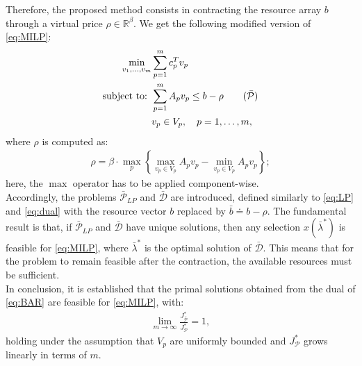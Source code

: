 Therefore, the proposed method consists in contracting the resource array $b$ through a virtual price $\rho \in \mathbb{R}^{\beta}$. We get the following modified version of \ref{eq:MILP}:
\begin{align*}
    \min_{v_1, \dots, v_m} & \sum_{p=1}^{m} c_p^T v_p                                                     \\
    \text{subject to: }    & \sum_{p=1}^{m} A_p v_p \leq b -\rho \tag{$\bar{\mathcal{P}}$} \label{eq:BAR} \\
                           & v_p \in V_p, \quad p = 1, \dots, m,
\end{align*}
where $\rho$ is computed as:
\begin{align}
    \rho = \beta\cdot\max_{p} \left\{\max_{v_p \in V_p}A_p v_p - \min_{v_p \in V_p}A_p v_p \right\}; \label{eq:rho_vuj}
\end{align}
here, the $\max$ operator has to be applied component-wise.\\
Accordingly, the problems $\bar{\mathcal{P}}_{LP}$ and $\bar{\mathcal{D}}$ are introduced, defined similarly to \ref{eq:LP} and \ref{eq:dual} with the resource vector $b$ replaced by $\bar{b}\doteq b - \rho$. The fundamental result is that, if $\bar{\mathcal{P}}_{LP}$ and $\bar{\mathcal{D}}$ have unique solutions, then any selection $x(\bar{\lambda}^*)$ is feasible for \ref{eq:MILP}, where $\bar{\lambda}^*$ is the optimal solution of $\bar{\mathcal{D}}$. This means that for the problem to remain feasible after the contraction, the available resources must be sufficient.\\
In conclusion, it is established that the primal solutions obtained from the dual of \ref{eq:BAR} are feasible for \ref{eq:MILP}, with:
\begin{align}
    \lim_{m \to \infty} \frac{J^*_{\bar{\mathcal{P}}}}{J^*_{\mathcal{P}}} = 1, \label{eq:ratio}
\end{align}
holding under the assumption that $V_p$ are uniformly bounded and $J^*_{\mathcal{P}}$ grows linearly in terms of $m$.


